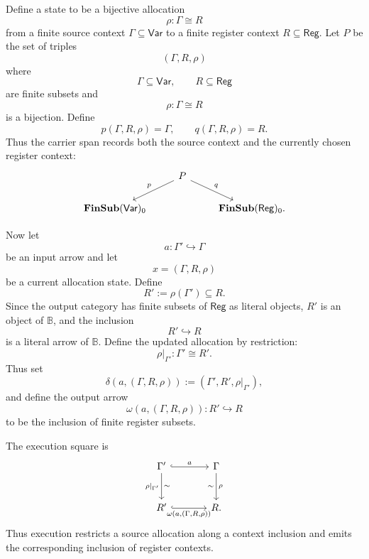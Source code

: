 \begin{example}
    Define a state to be a bijective allocation
    \[
        \rho:\Gamma\cong R
    \]
    from a finite source context \(\Gamma\subseteq\mathsf{Var}\) to a finite register context \(R\subseteq\mathsf{Reg}\). Let \(P\) be the set of triples
    \[
        (\Gamma,R,\rho)
    \]
    where
    \[
        \Gamma\subseteq\mathsf{Var},
        \qquad
        R\subseteq\mathsf{Reg}
    \]
    are finite subsets and
    \[
        \rho:\Gamma\cong R
    \]
    is a bijection. Define
    \[
        p(\Gamma,R,\rho)=\Gamma,
        \qquad
        q(\Gamma,R,\rho)=R.
    \]
    Thus the carrier span records both the source context and the currently chosen register context:
    \[
        \begin{tikzcd}
            &
                P
                    \arrow[dl, "p"']
                    \arrow[dr, "q"]
            &
            \\
                \mathbf{FinSub}(\mathsf{Var})_0
            &
            &
                \mathbf{FinSub}(\mathsf{Reg})_0.
        \end{tikzcd}
    \]
    
    Now let
    \[
        a:\Gamma'\hookrightarrow \Gamma
    \]
    be an input arrow and let
    \[
        x=(\Gamma,R,\rho)
    \]
    be a current allocation state. Define
    \[
        R':=\rho(\Gamma')\subseteq R.
    \]
    Since the output category has finite subsets of \(\mathsf{Reg}\) as literal objects, \(R'\) is an object of \(\mathbb B\), and the inclusion
    \[
        R'\hookrightarrow R
    \]
    is a literal arrow of \(\mathbb B\). Define the updated allocation by restriction:
    \[
        \rho|_{\Gamma'}:\Gamma'\cong R'.
    \]
    Thus set
    \[
        \delta(a,(\Gamma,R,\rho))
        :=
        (\Gamma',R',\rho|_{\Gamma'}),
    \]
    and define the output arrow
    \[
        \omega(a,(\Gamma,R,\rho)):R'\hookrightarrow R
    \]
    to be the inclusion of finite register subsets.
    
    The execution square is
    \[
        \begin{tikzcd}[column sep=large, row sep=large]
                \Gamma'
                    \arrow[r, hook, "{a}"]
                    \arrow[d, "{\rho|_{\Gamma'}}"', "\sim"]
            &
                \Gamma
                    \arrow[d, "{\rho}", "\sim"']
            \\
                R'
                    \arrow[r, hook, "{\omega(a,(\Gamma,R,\rho))}"']
            &
                R.
        \end{tikzcd}
    \]
    Thus execution restricts a source allocation along a context inclusion and emits the corresponding inclusion of register contexts.
    

\end{example}
